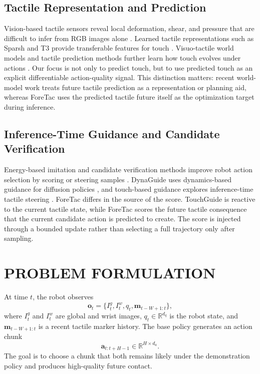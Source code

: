 \documentclass[letterpaper, 10 pt, conference]{ieeeconf}
\newcommand{\method}{ForeTac}
\newcommand{\Real}{\mathbb{R}}
\newcommand{\marker}{\mathbf{m}}
\newcommand{\action}{\mathbf{a}}
\newcommand{\obs}{\mathbf{o}}
\begin{document}
\subsection{Tactile Representation and Prediction}

Vision-based tactile sensors reveal local deformation, shear, and pressure that
are difficult to infer from RGB images alone \cite{calandra2018more,
lee2019making,li2022see}. Learned tactile representations such as Sparsh and
T3 provide transferable features for touch \cite{higuera2024sparsh,
zhao2024t3}. Visuo-tactile world models and tactile prediction methods further
learn how touch evolves under actions \cite{ye2025dreamtacvla,
zheng2026omnivta,higuera2026vtwm,niu2026htd}. Our focus is not only to predict
touch, but to use predicted touch as an explicit differentiable action-quality
signal. This distinction matters: recent world-model work treats future tactile
prediction as a representation or planning aid, whereas \method{} uses the
predicted tactile future itself as the optimization target during inference.

\subsection{Inference-Time Guidance and Candidate Verification}

Energy-based imitation and candidate verification methods improve robot action
selection by scoring or steering samples \cite{florence2021ibc,
saxena2025sitcom}. DynaGuide uses dynamics-based guidance for diffusion
policies \cite{du2025dynaguide}, and touch-based guidance explores
inference-time tactile steering \cite{zhang2026touchguide}. \method{} differs
in the source of the score. TouchGuide is reactive to the current tactile
state, while \method{} scores the future tactile consequence that the current
candidate action is predicted to create. The score is injected through a
bounded update rather than selecting a full trajectory only after sampling.

\section{PROBLEM FORMULATION}

At time $t$, the robot observes
\begin{equation}
\obs_t = \{I_t^g, I_t^w, q_t, \marker_{t-W+1:t}\},
\end{equation}
where $I_t^g$ and $I_t^w$ are global and wrist images, $q_t \in \Real^{d_q}$ is
the robot state, and $\marker_{t-W+1:t}$ is a recent tactile marker history. The
base policy generates an action chunk
\begin{equation}
\action_{t:t+H-1} \in \Real^{H \times d_a}.
\end{equation}
The goal is to choose a chunk that both remains likely under the demonstration
policy and produces high-quality future contact.
\end{document}
